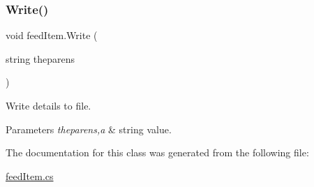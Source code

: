 \subsubsection{\texorpdfstring{Write()}{Write()}}
{\footnotesize\ttfamily void feed\+Item.\+Write (\begin{DoxyParamCaption}\item[{string}]{theparens }\end{DoxyParamCaption})\hspace{0.3cm}{\ttfamily [inline]}}



Write details to file. 


\begin{DoxyParams}{Parameters}
{\em theparens,a} & string value. \\
\hline
\end{DoxyParams}


The documentation for this class was generated from the following file\+:\begin{DoxyCompactItemize}
\item 
\mbox{\hyperlink{feed_item_8cs}{feed\+Item.\+cs}}\end{DoxyCompactItemize}

